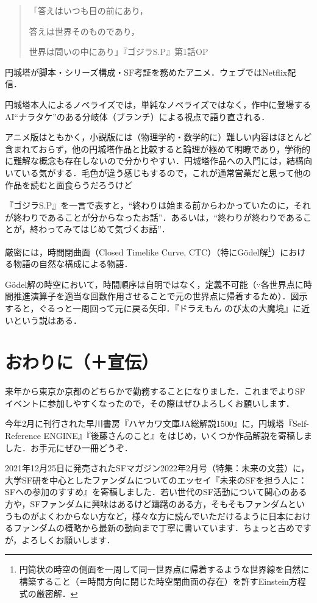 \documentclass[10pt, a5paper, twoside]{jsarticle}
\theoremstyle{definition}
\begin{document}
		\begin{quote}

			「答えはいつも目の前にあり，

			答えは世界そのものであり，
			
			世界は問いの中にあり」\hspace{\fill}『ゴジラS.P』第1話OP
		
		\end{quote}

		円城塔が脚本・シリーズ構成・SF考証を務めたアニメ．ウェブではNetflix配信．

		円城塔本人によるノベライズでは，単純なノベライズではなく，作中に登場するAI“ナラタケ”のある分岐体（ブランチ）による視点で語り直される．

		アニメ版はともかく，小説版には（物理学的・数学的に）難しい内容はほとんど含まれておらず，他の円城塔作品と比較すると論理が極めて明瞭であり，学術的に難解な概念も存在しないので分かりやすい．円城塔作品への入門には，結構向いている気がする．毛色が違う感じもするので，これが通常営業だと思って他の作品を読むと面食らうだろうけど

		『ゴジラS.P』を一言で表すと，“終わりは始まる前からわかっていたのに，それが終わりであることが分からなったお話”．あるいは，“終わりが終わりであることが，終わってみてはじめて気づくお話”．

		厳密には，時間閉曲面（Closed Timelike Curve, CTC）（特にGödel解\footnote{円筒状の時空の側面を一周して同一世界点に帰着するような世界線を自然に構築すること（＝時間方向に閉じた時空閉曲面の存在）を許すEinstein方程式の厳密解．}）における物語の自然な構成による物語．

		Gödel解の時空において，時間順序は自明ではなく，定義不可能（$ \because $各世界点に時間推進演算子を適当な回数作用させることで元の世界点に帰着するため）．図示すると，ぐるっと一周回って元に戻る矢印．『ドラえもん のび太の大魔境』に近いという説はある．


	\section{おわりに（＋宣伝）}

		来年から東京か京都のどちらかで勤務することになりました．これまでよりSFイベントに参加しやすくなったので，その際はぜひよろしくお願いします．

		今年2月に刊行された早川書房『ハヤカワ文庫JA総解説1500』に，円城塔『Self-Reference ENGINE』『後藤さんのこと』をはじめ，いくつか作品解説を寄稿しました．お手元にぜひ一冊どうぞ．

		2021年12月25日に発売されたSFマガジン2022年2月号（特集：未来の文芸）に，大学SF研を中心としたファンダムについてのエッセイ『未来のSFを担う人に：SFへの参加のすすめ』を寄稿しました．若い世代のSF活動について関心のある方や，SFファンダムに興味はあるけど躊躇のある方，そもそもファンダムというものがよくわからない方など，様々な方に読んでいただけるように日本におけるファンダムの概略から最新の動向まで丁寧に書いています．ちょっと古めですが，よろしくお願いします．
\end{document}
